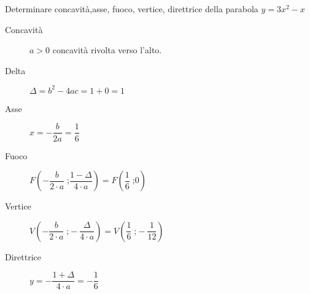 	Determinare concavità,asse, fuoco, vertice, direttrice della parabola $y=3x^2-x$
	\begin{description}
		\item[Concavità] $a>0$ concavità rivolta verso l'alto.
		\item[Delta] $\Delta=b^2-4ac=1+0=1$
		\item[Asse] $x=-\dfrac{b}{2a}=\dfrac{1}{6}$
		\item[Fuoco] $F\left(-\dfrac{b}{2\cdot a}\;\text{;}\dfrac{1-\Delta}{4\cdot a}\right)=F\left(\dfrac{1}{6}\;\text{;}0\right)$
		\item[Vertice] $V\left(-\dfrac{b}{2\cdot a}\;\text{;}-\dfrac{\Delta}{4\cdot a}\right)=V\left(\dfrac{1}{6}\;\text{;}-\dfrac{1}{12}\right)$
		\item[Direttrice] $y=-\dfrac{1+\Delta}{4\cdot a}=-\dfrac{1}{6}$
	\end{description}
